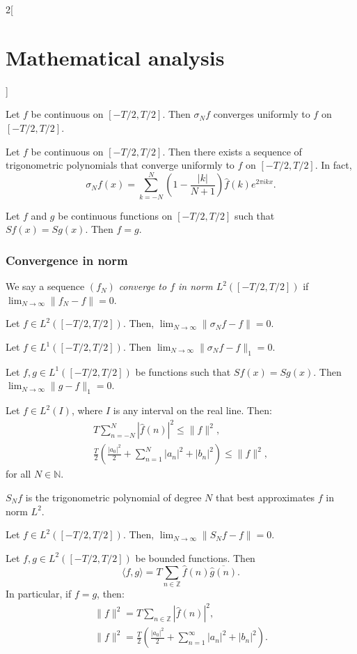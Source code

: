 \documentclass[class=article,crop=false]{standalone}
\begin{document}
\begin{multicols}{2}[\section{Mathematical analysis}]
\begin{theorem}
Let $f$ be continuous on $[-T/2,T/2]$. Then $\sigma_Nf$ converges uniformly to $f$ on $[-T/2,T/2]$.
\end{theorem}
\begin{corollary}
Let $f$ be continuous on $[-T/2,T/2]$. Then there exists a sequence of trigonometric polynomials that converge uniformly to $f$ on $[-T/2,T/2]$. In fact, $$\sigma_Nf(x)=\sum_{k=-N}^N\left(1-\frac{|k|}{N+1}\right)\widehat{f}(k)e^{2\pi ikx}.$$
\end{corollary}
\begin{corollary}
Let $f$ and $g$ be continuous functions on $[-T/2,T/2]$ such that $Sf(x)=Sg(x)$. Then $f=g$.
\end{corollary}
\subsubsection*{Convergence in norm}
\begin{definition}
We say a sequence $(f_N)$ \textit{converge to $f$ in norm $L^2([-T/2,T/2])$} if $\displaystyle\lim_{N\to\infty}\|f_N-f\|=0$.
\end{definition}
\begin{theorem}
Let $f\in L^2([-T/2,T/2])$. Then, $\displaystyle\lim_{N\to\infty}\|\sigma_Nf-f\|=0$.
\end{theorem}
\begin{corollary}
Let $f\in L^1([-T/2,T/2])$. Then $\displaystyle\lim_{N\to\infty}\|\sigma_Nf-f\|_1=0$.
\end{corollary}
\begin{corollary}
Let $f,g\in L^1([-T/2,T/2])$ be functions such that $Sf(x)=Sg(x)$. Then $\displaystyle\lim_{N\to\infty}\|g-f\|_1=0$.
\end{corollary}
\begin{theorem}
Let $f\in L^2(I)$, where $I$ is any interval on the real line. Then: \begin{gather*}T\sum_{n=-N}^N|\widehat{f}(n)|^2\leq\|f\|^2,\\\frac{T}{2}\left(\frac{|a_0|^2}{2}+\sum_{n=1}^N|a_n|^2+|b_n|^2\right)\leq \|f\|^2,\end{gather*} for all $N\in\mathbb{N}$.
\end{theorem}
\begin{theorem}
$S_Nf$ is the trigonometric polynomial of degree $N$ that best approximates $f$ in norm $L^2$.
\end{theorem}
\begin{corollary}
Let $f\in L^2([-T/2,T/2])$. Then, $\displaystyle\lim_{N\to\infty}\|S_Nf-f\|=0$.
\end{corollary}
\begin{theorem}
Let $f,g\in L^2([-T/2,T/2])$ be bounded functions. Then $$\langle f,g\rangle=T\sum_{n\in\mathbb{Z}}\widehat{f}(n)\overline{\widehat{g}(n)}.$$
In particular, if $f=g$, then:
\begin{gather*}\|f\|^2=T\sum_{n\in\mathbb{Z}}|\widehat{f}(n)|^2,\\\|f\|^2=\frac{T}{2}\left(\frac{|a_0|^2}{2}+\sum_{n=1}^\infty|a_n|^2+|b_n|^2\right).\end{gather*}
\end{theorem}

\end{multicols}
\end{document}
